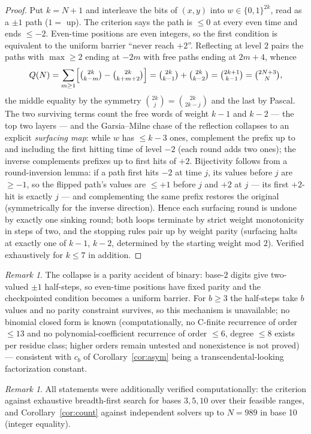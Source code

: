 \documentclass[11pt]{article}
\theoremstyle{remark}
\newtheorem{remark}[theorem]{Remark}
\begin{document}
\begin{proof}
Put $k=N+1$ and interleave the bits of $(x,y)$ into $w\in\{0,1\}^{2k}$, read as
a $\pm1$ path ($1=$ up). The criterion says the path is $\le 0$ at every even
time and ends $\le-2$. Even-time positions are even integers, so the first
condition is equivalent to the uniform barrier ``never reach $+2$''. Reflecting
at level $2$ pairs the paths with $\max\ge2$ ending at $-2m$ with free paths
ending at $2m+4$, whence
\[
Q(N)=\sum_{m\ge1}\Bigl[\tbinom{2k}{k-m}-\tbinom{2k}{k+m+2}\Bigr]
=\tbinom{2k}{k-1}+\tbinom{2k}{k-2}=\tbinom{2k+1}{k-1}=\tbinom{2N+3}{N},
\]
the middle equality by the symmetry $\binom{2k}{j}=\binom{2k}{2k-j}$ and the
last by Pascal. The two surviving terms count the free words of weight $k-1$
and $k-2$ --- the top two layers --- and the Garsia--Milne chase of the
reflection collapses to an explicit \emph{surfacing map}: while $w$ has
$\le k-3$ ones, complement the prefix up to and including the first hitting
time of level $-2$ (each round adds two ones); the inverse complements prefixes
up to first hits of $+2$. Bijectivity follows from a round-inversion lemma: if
a path first hits $-2$ at time $j$, its values before $j$ are $\ge-1$, so the
flipped path's values are $\le+1$ before $j$ and $+2$ at $j$ --- its first
$+2$-hit is exactly $j$ --- and complementing the same prefix restores the
original (symmetrically for the inverse direction). Hence each surfacing round
is undone by exactly one sinking round; both loops terminate by strict weight
monotonicity in steps of two, and the stopping rules pair up by weight parity
(surfacing halts at exactly one of $k-1$, $k-2$, determined by the starting
weight mod $2$). Verified exhaustively for $k\le7$ in addition.
\end{proof}

\begin{remark}
The collapse is a parity accident of binary: base-$2$ digits give two-valued
$\pm1$ half-steps, so even-time positions have fixed parity and the
checkpointed condition becomes a uniform barrier. For $b\ge3$ the half-steps
take $b$ values and no parity constraint survives, so this mechanism is
unavailable; no binomial closed form is known (computationally, no C-finite
recurrence of order $\le13$ and no polynomial-coefficient recurrence of order
$\le6$, degree $\le8$ exists per residue class; higher orders remain untested
and nonexistence is not proved) --- consistent with $c_b$ of Corollary~\ref{cor:asym} being a
transcendental-looking factorization constant.
\end{remark}

\begin{remark}
All statements were additionally verified computationally: the criterion against
exhaustive breadth-first search for bases $3,5,10$ over their feasible ranges, and
Corollary~\ref{cor:count} against independent solvers up to $N=989$ in base 10
(integer equality).
\end{remark}
\end{document}
